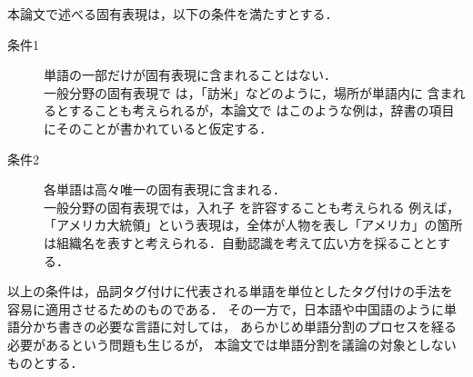 \documentclass[japanese]{jnlp_1.4}
\begin{document}
本論文で述べる固有表現は，以下の条件を満たすとする．
\begin{description}

\item[条件1] 単語の一部だけが固有表現に含まれることはない．\\
一般分野の固有表現で
  は，「訪米」などのように，場所が単語内に
  含まれるとすることも考えられるが，本論文で
  はこのような例は，辞書の項目にそのことが書かれていると仮定する．

\item[条件2] 各単語は高々唯一の固有表現に含まれる． \\
一般分野の固有表現では，入れ子
  を許容することも考えられる\cite{Nested.Named.Entity.Recognition,
  The.GENIA.Corpus:.an.Annotated.Research.Abstract.Corpus.in.Molecular.Biology.Domain}
  例えば，「アメリカ大統領」という表現は，全体が人物を表し「アメリカ」の箇所
  は組織名を表すと考えられる．自動認識を考えて広い方を採ることとする．

\end{description}
以上の条件は，品詞タグ付けに代表される単語を単位としたタグ付けの手法を
容易に適用させるためのものである．
その一方で，日本語や中国語のように単語分かち書きの必要な言語に対しては，
あらかじめ単語分割のプロセスを経る必要があるという問題も生じるが，
本論文では単語分割を議論の対象としないものとする．
\end{document}
